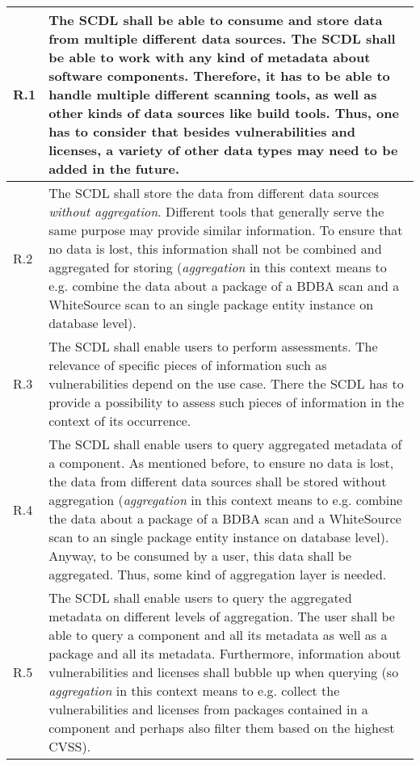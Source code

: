\begin{xltabular}{\linewidth}{|l|X|}
	R.1 & The SCDL shall be able to consume and store data from multiple different data sources.\newline\newline
	The SCDL shall be able to work with any kind of metadata about software components. Therefore, it has to be able to handle multiple different scanning tools, as well as other kinds of data sources like build tools. Thus, one has to consider that besides vulnerabilities and licenses, a variety of other data types may need to be added in the future. \\
	\hline
	R.2 & The SCDL shall store the data from different data sources \textit{without aggregation}.\newline\newline
	Different tools that generally serve the same purpose may provide similar information. To ensure that no data is lost, this information shall not be combined and aggregated for storing (\textit{aggregation} in this context means to e.g. combine the data about a package of a BDBA scan and a WhiteSource scan to an single package entity instance on database level).\\
	\hline
	R.3 & The SCDL shall enable users to perform assessments.\newline\newline
	The relevance of specific pieces of information such as vulnerabilities depend on the use case. There the SCDL has to provide a possibility to assess such pieces of information in the context of its occurrence.\\
	\hline
	R.4 & The SCDL shall enable users to query aggregated metadata of a component.\newline\newline
	As mentioned before, to ensure no data is lost, the data from different data sources shall be stored without aggregation (\textit{aggregation} in this context means to e.g. combine the data about a package of a BDBA scan and a WhiteSource scan to an single package entity instance on database level). Anyway, to be consumed by a user, this data shall be aggregated. Thus, some kind of aggregation layer is needed.\\
	\hline
	R.5 & The SCDL shall enable users to query the aggregated metadata on different levels of aggregation.\newline\newline
	The user shall be able to query a component and all its metadata as well as a package and all its metadata. Furthermore, information about vulnerabilities and licenses shall bubble up when querying (so \textit{aggregation} in this context means to e.g. collect the vulnerabilities and licenses from packages contained in a component and perhaps also filter them based on the highest CVSS). 

\end{xltabular}

